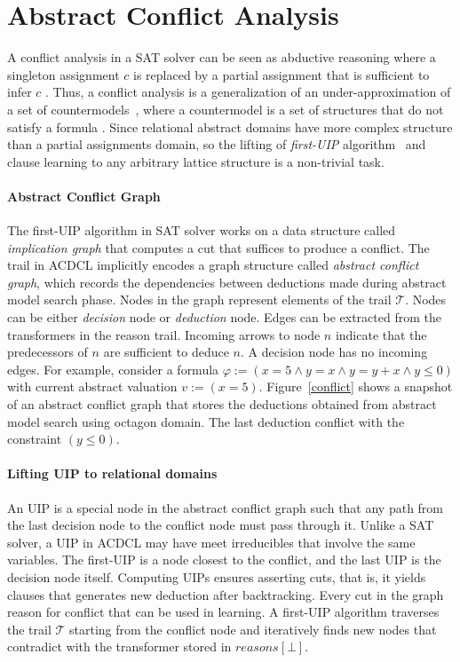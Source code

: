 \section{Abstract Conflict Analysis}
A conflict analysis in a SAT solver can be seen as abductive 
reasoning where a singleton assignment $c$ is replaced by a partial 
assignment that is sufficient to infer $c$ .  Thus, a conflict 
analysis is a generalization of an under-approximation of a set of 
countermodels~\cite{sas12,dhk2013-popl}, where a countermodel is a 
set of structures that do not satisfy a formula .  Since relational 
abstract domains have more complex structure than a partial 
assignments domain, so the lifting of {\em first-UIP} algorithm~\cite{uip} 
and clause learning to any arbitrary lattice structure is a non-trivial task. 

\paragraph {\textbf{Abstract Conflict Graph}}
The first-UIP algorithm in SAT solver works on a data structure called 
{\em implication graph} that computes a cut that suffices to produce a 
conflict.  The trail in ACDCL implicitly encodes a graph structure called 
{\em abstract conflict graph}, which records the dependencies between 
deductions made during abstract model search phase.  Nodes in the graph 
represent elements of the trail $\mathcal{T}$.  Nodes can be either 
{\em decision} node or {\em deduction} node. Edges can be extracted from
the transformers in the reason trail.  Incoming arrows to node $n$ 
indicate that the predecessors of $n$ are sufficient to deduce $n$.  
A decision node has no incoming edges.  
For example, consider a formula 
$\varphi:= (x=5 \wedge y=x \wedge y=y+x \wedge y \leq 0)$ with current 
abstract valuation $v:= (x=5)$.  Figure~\ref{conflict} shows a 
snapshot of an abstract conflict graph that 
stores the deductions obtained from abstract model search using octagon domain.  
The last deduction conflict with the constraint $(y \leq 0)$.  

\paragraph {\textbf{Lifting UIP to relational domains}}
An UIP is a special node in the abstract conflict graph such that 
any path from the last decision node to the conflict node must pass 
through it.  Unlike a SAT solver, a UIP in ACDCL may have meet irreducibles 
that involve the same variables.  The first-UIP is a node closest  to the 
conflict, and the last UIP is the decision node itself.  Computing UIPs ensures 
asserting cuts, that is, it yields clauses that generates new deduction after 
backtracking.  Every cut in the graph reason for conflict that can be used in learning.  
A first-UIP algorithm traverses the trail $\mathcal{T}$ starting from the 
conflict node and iteratively finds new nodes that contradict  with the 
transformer stored in $reasons[\bot]$.  

